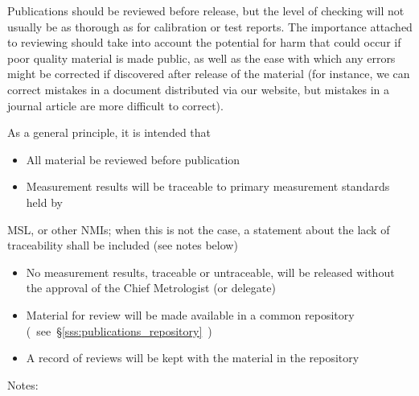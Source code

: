 Publications should be reviewed before release, but the level of checking will not usually be as thorough as for calibration or test reports. The importance attached to reviewing should take into account the potential for harm that could occur if poor quality material is made public, as well as the ease with which any errors might be corrected if discovered after release of the material (for instance, we can correct mistakes in a document distributed via our website, but mistakes in a journal article are more difficult to correct).  

As a general principle, it is intended that
\begin{itemize}
\item  All material be reviewed before publication
\item  Measurement results will be traceable to primary measurement standards held by 
\end{itemize}
MSL, or other NMIs; when this is not the case, a statement about the lack of traceability shall be included (see notes below)
\begin{itemize}
\item  No measurement results, traceable or untraceable, will be released without the approval of the Chief Metrologist (or delegate) 
\item  Material for review will be made available in a common repository (~see~\S\ref{sss:publications_repository}~)
\item  A record of reviews will be kept with the material in the repository 
\end{itemize}
Notes: 
